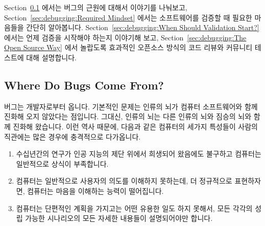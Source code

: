 Section~\ref{sec:debugging:Where Do Bugs Come From?}
에서는 버그의 근원에 대해서 이야기를 나눠보고,
Section~\ref{sec:debugging:Required Mindset}
에서는 소프트웨어를 검증할 때 필요한 마음들을 간단히 알아봅니다.
Section~\ref{sec:debugging:When Should Validation Start?}
에서는 언제 검증을 시작해야 하는지 이야기해 보고,
Section~\ref{sec:debugging:The Open Source Way} 에서 놀랍도록 효과적인 오픈소스
방식의 코드 리뷰와 커뮤니티 테스트에 대해 설명합니다.

\subsection{Where Do Bugs Come From?}
\label{sec:debugging:Where Do Bugs Come From?}

버그는 개발자로부터 옵니다.
기본적인 문제는 인류의 뇌가 컴퓨터 소프트웨어와 함께 진화해 오지 않았다는
점입니다.
그대신, 인류의 뇌는 다른 인류의 뇌와 짐승의 뇌와 함께 진화해 왔습니다.
이런 역사 때문에, 다음과 같은 컴퓨터의 세가지 특성들이 사람의 직관에는 많은
경우에 충격적으로 다가옵니다.

\begin{enumerate}
\item	수십년간의 연구가 인공 지능의 제단 위에서 희생되어 왔음에도 불구하고
	컴퓨터는 일반적으로 상식이 부족합니다.
\item	컴퓨터는 일반적으로 사용자의 의도를 이해하지 못하는데, 더 정규적으로
	표현하자면, 컴퓨터는 마음을 이해하는 능력이 떨어집니다.
\item	컴퓨터는 단편적인 계획을 가지고는 어떤 유용한 일도 하지 못해서, 모든
	각각의 성립 가능한 시나리오의 모든 자세한 내용들이 설명되어야만 합니다.

\end{enumerate}

